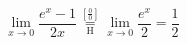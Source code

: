 \[
    \lim_{x\to 0}{\frac{e^x-1}{2x}}
    \overset{\left[\frac{0}{0}\right]}{\underset{\mathrm{H}}{=}}
    \lim_{x\to 0}{\frac{e^x}{2}}={\frac{1}{2}}
\]